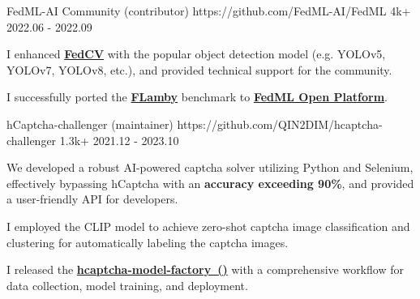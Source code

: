 
\begin{cventries}

\cvproject
{FedML-AI Community (contributor)} %
{https://github.com/FedML-AI/FedML} %
{4k+} %
{2022.06 - 2022.09} %
{
\begin{cvitems} %
\item {I enhanced \href{https://github.com/FedML-AI/FedCV}{\textbf{FedCV}} with the popular object detection model (e.g. YOLOv5, YOLOv7, YOLOv8, etc.), and provided technical support for the community.}
\item {I successfully ported the \href{https://github.com/owkin/FLamby}{\textbf{FLamby}} benchmark to \href{https://open.fedml.ai/}{\textbf{FedML Open Platform}}.}
\end{cvitems}
} %



\cvproject
{hCaptcha-challenger (maintainer)} %
{https://github.com/QIN2DIM/hcaptcha-challenger} %
{1.3k+} %
{2021.12 - 2023.10} %
{
\begin{cvitems} %
\item {We developed a robust AI-powered captcha solver utilizing Python and Selenium, effectively bypassing hCaptcha with an \textbf{accuracy exceeding 90\%}, and provided a user-friendly API for developers.}
\item {I employed the CLIP model to achieve zero-shot captcha image classification and clustering for automatically labeling the captcha images.}
\item {I released the \href{https://github.com/CaptchaAgent/hcaptcha-model-factory}{\textbf{hcaptcha-model-factory~()}} with a comprehensive workflow for data collection, model training, and deployment.}
\end{cvitems}
} %




\end{cventries}
